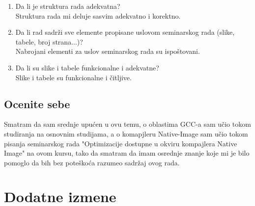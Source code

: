 \documentclass[a4paper]{report}
\begin{document}
\begin{enumerate}
\item Da li je struktura rada adekvatna?\\
Struktura rada mi deluje sasvim adekvatno i korektno.

\item Da li rad sadrži sve elemente propisane uslovom seminarskog rada (slike, tabele, broj strana...)?\\
Nabrojani elementi za uslov seminarskog rada su ispoštovani.

\item Da li su slike i tabele funkcionalne i adekvatne?\\
Slike i tabele su funkcionalne i čitljive.

\end{enumerate}

\section{Ocenite sebe}
Smatram da sam srednje upućen u ovu temu, o oblastima GCC-a sam učio tokom studiranja na osnovnim studijama, a o komapjleru Native-Image sam učio tokom pisanja seminarskog rada "Optimizacije dostupne u okviru kompajlera
Native Image" na ovom kursu, tako da smatram da imam osrednje znanje koje mi je bilo pomoglo da bih bez poteškoća razumeo sadržaj ovog rada.


\chapter{Dodatne izmene}
\end{document}
